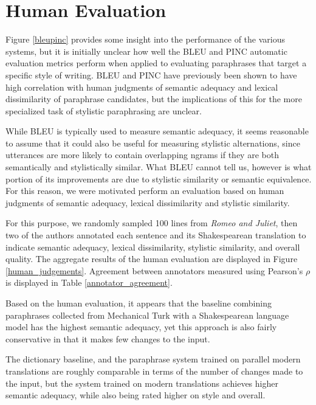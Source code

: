 \documentclass[10pt,a5paper,twoside]{article}
\begin{document}
\section{Human Evaluation}
\label{human_evaluation}
Figure \ref{bleupinc} provides some insight into the performance of the various systems, but it is initially unclear how well the BLEU and PINC
automatic evaluation metrics perform when applied to evaluating paraphrases that target a specific style of writing.  BLEU and PINC have previously
been shown to have high correlation with human judgments of semantic adequacy and lexical dissimilarity of paraphrase candidates, 
but the implications of this for the more specialized task of stylistic paraphrasing are unclear.

While BLEU is typically used to measure semantic adequacy, it seems reasonable to assume that it 
could also be useful for measuring stylistic alternations, since utterances
are more likely to contain overlapping ngrams if they are both semantically and stylistically similar.  What BLEU cannot tell us, however
is what portion of its improvements are due to stylistic similarity or semantic equivalence.  For this reason, we were motivated perform
an evaluation based on human judgments of semantic adequacy, lexical dissimilarity and stylistic similarity.

For this purpose, we randomly sampled 100 lines from {\em Romeo and Juliet}, then two of the authors annotated each sentence and its Shakespearean
translation to indicate semantic adequacy, lexical dissimilarity, stylistic similarity, and overall quality.
The aggregate results of the human evaluation are displayed in Figure \ref{human_judgements}.  Agreement between annotators
measured using Pearson's $\rho$ is displayed in Table \ref{annotator_agreement}.

Based on the human evaluation, it appears that the baseline combining paraphrases collected from Mechanical Turk \cite{chen11} with
a Shakespearean language model has the highest semantic adequacy, yet this approach is also fairly conservative in that it makes few changes to the input.

The dictionary baseline, and the paraphrase system trained on parallel modern translations are roughly comparable in terms of 
the number of changes made to the input, but the system trained on modern translations achieves higher semantic adequacy, while also being rated higher on style and overall.
\end{document}
